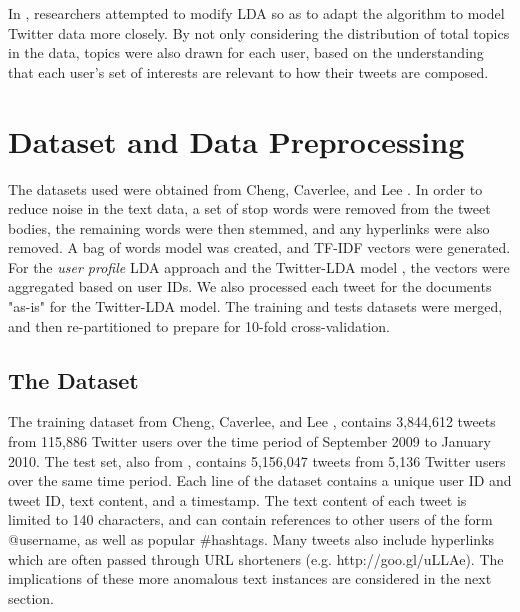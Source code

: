 \documentclass{acm_proc_article-sp}
\begin{document}
\hspace*{5mm}In \cite{zhao2011comparing}, researchers attempted to modify LDA so as to adapt the algorithm to model Twitter data more closely. By not only considering the distribution of total topics in the data, topics were also drawn for each user, based on the understanding that each user's set of interests are relevant to how their tweets are composed.

\section{Dataset and Data Preprocessing}
\hspace*{5mm}The datasets used were obtained from Cheng, Caverlee, and Lee \cite{cheng2010content}. In order to reduce noise in the text data, a set of stop words were removed from the tweet bodies, the remaining words were then stemmed, and any hyperlinks were also removed. A bag of words model was created, and TF-IDF vectors were generated. For the \textit{user profile} LDA approach \cite{hong2010empirical} and the Twitter-LDA model \cite{zhao2011comparing}, the vectors were aggregated based on user IDs. We also processed each tweet for the documents "as-is" for the Twitter-LDA model. The training and tests datasets were merged, and then re-partitioned to prepare for 10-fold cross-validation.

\subsection{The Dataset}
\hspace*{5mm}The training dataset from Cheng, Caverlee, and Lee \cite{cheng2010content}, contains 3,844,612 tweets from 115,886 Twitter users over the time period of September 2009 to January 2010. The test set, also from \cite{cheng2010content}, contains 5,156,047 tweets from 5,136 Twitter users over the same time period. Each line of the dataset contains a unique user ID and tweet ID, text content, and a timestamp. The text content of each tweet is limited to 140 characters, and can contain references to other users of the form @username, as well as popular \#hashtags. Many tweets also include hyperlinks which are often passed through URL shorteners (e.g. http://goo.gl/uLLAe). The implications of these more anomalous text instances are considered in the next section.
\end{document}
